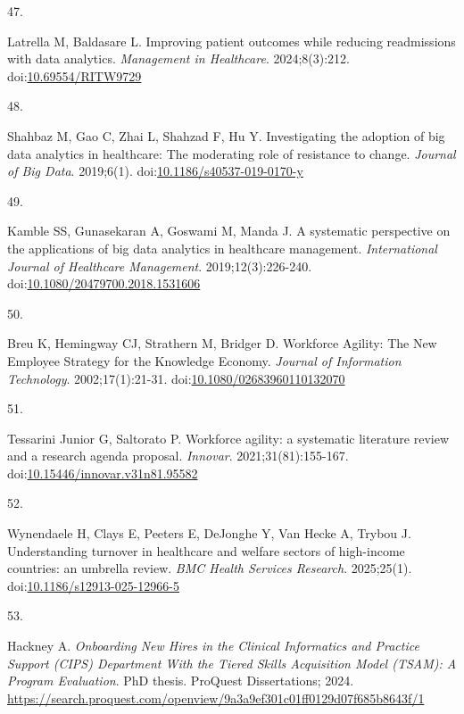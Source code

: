 \documentclass[
  american,
  11pt,
  letterpaper,
  oneside  ,captions=tableheading
]{scrartcl}
\newlength{\cslhangindent}
\newlength{\csllabelwidth}
\newenvironment{CSLReferences}[2] %
 {\begin{list}{}{%
  \setlength{\itemindent}{0pt}
  \setlength{\leftmargin}{0pt}
  \setlength{\parsep}{0pt}
  \ifodd #1
   \setlength{\leftmargin}{\cslhangindent}
   \setlength{\itemindent}{-1\cslhangindent}
  \fi
  \setlength{\itemsep}{#2\baselineskip}}}
 {\end{list}}
\newcommand{\CSLLeftMargin}[1]{\parbox[t]{\csllabelwidth}{\strut#1\strut}}
\newcommand{\CSLRightInline}[1]{\parbox[t]{\linewidth - \csllabelwidth}{\strut#1\strut}}
\begin{document}
\begin{CSLReferences}{0}{1}
\CSLLeftMargin{47. }%
\CSLRightInline{Latrella M, Baldasare L. {Improving patient outcomes
while reducing readmissions with data analytics}. \emph{Management in
Healthcare}. 2024;8(3):212.
doi:\href{https://doi.org/10.69554/RITW9729}{10.69554/RITW9729}}

\CSLLeftMargin{48. }%
\CSLRightInline{Shahbaz M, Gao C, Zhai L, Shahzad F, Hu Y.
{Investigating the adoption of big data analytics in healthcare: The
moderating role of resistance to change}. \emph{Journal of Big Data}.
2019;6(1).
doi:\href{https://doi.org/10.1186/s40537-019-0170-y}{10.1186/s40537-019-0170-y}}

\CSLLeftMargin{49. }%
\CSLRightInline{Kamble SS, Gunasekaran A, Goswami M, Manda J. {A
systematic perspective on the applications of big data analytics in
healthcare management}. \emph{International Journal of Healthcare
Management}. 2019;12(3):226-240.
doi:\href{https://doi.org/10.1080/20479700.2018.1531606}{10.1080/20479700.2018.1531606}}

\CSLLeftMargin{50. }%
\CSLRightInline{Breu K, Hemingway CJ, Strathern M, Bridger D. {Workforce
Agility: The New Employee Strategy for the Knowledge Economy}.
\emph{Journal of Information Technology}. 2002;17(1):21-31.
doi:\href{https://doi.org/10.1080/02683960110132070}{10.1080/02683960110132070}}

\CSLLeftMargin{51. }%
\CSLRightInline{Tessarini Junior G, Saltorato P. {Workforce agility: a
systematic literature review and a research agenda proposal}.
\emph{Innovar}. 2021;31(81):155-167.
doi:\href{https://doi.org/10.15446/innovar.v31n81.95582}{10.15446/innovar.v31n81.95582}}

\CSLLeftMargin{52. }%
\CSLRightInline{Wynendaele H, Clays E, Peeters E, DeJonghe Y, Van Hecke
A, Trybou J. {Understanding turnover in healthcare and welfare sectors
of high-income countries: an umbrella review}. \emph{BMC Health Services
Research}. 2025;25(1).
doi:\href{https://doi.org/10.1186/s12913-025-12966-5}{10.1186/s12913-025-12966-5}}

\CSLLeftMargin{53. }%
\CSLRightInline{Hackney A. \emph{{Onboarding New Hires in the Clinical
Informatics and Practice Support (CIPS) Department With the Tiered
Skills Acquisition Model (TSAM): A Program Evaluation}}. PhD thesis.
ProQuest Dissertations; 2024.
\url{https://search.proquest.com/openview/9a3a9ef301c01ff0129d07f685b8643f/1}}


\end{CSLReferences}
\end{document}
